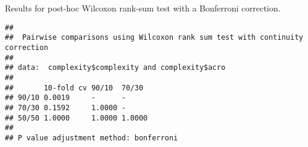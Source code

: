 \documentclass[
]{book}
\newenvironment{Shaded}{\begin{snugshade}}{\end{snugshade}}
\newcommand{\AttributeTok}[1]{\textcolor[rgb]{0.13,0.29,0.53}{#1}}
\newcommand{\ConstantTok}[1]{\textcolor[rgb]{0.56,0.35,0.01}{#1}}
\newcommand{\FunctionTok}[1]{\textcolor[rgb]{0.13,0.29,0.53}{\textbf{#1}}}
\newcommand{\NormalTok}[1]{#1}
\newcommand{\SpecialCharTok}[1]{\textcolor[rgb]{0.81,0.36,0.00}{\textbf{#1}}}
\newcommand{\StringTok}[1]{\textcolor[rgb]{0.31,0.60,0.02}{#1}}
\begin{document}
Results for post-hoc Wilcoxon rank-sum test with a Bonferroni correction.

\begin{Shaded}
\end{Shaded}

\begin{verbatim}
## 
##  Pairwise comparisons using Wilcoxon rank sum test with continuity correction 
## 
## data:  complexity$complexity and complexity$acro 
## 
##       10-fold cv 90/10  70/30 
## 90/10 0.0019     -      -     
## 70/30 0.1592     1.0000 -     
## 50/50 1.0000     1.0000 1.0000
## 
## P value adjustment method: bonferroni
\end{verbatim}

  
\end{document}
